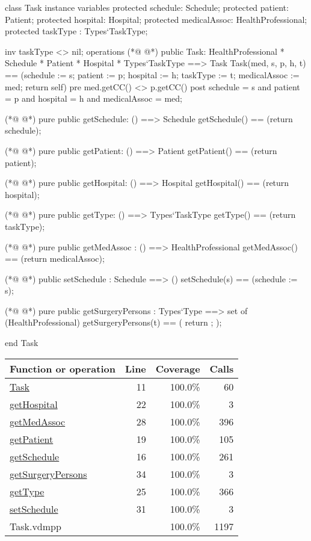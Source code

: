 \begin{vdmpp}[breaklines=true]
class Task
instance variables
  protected schedule: Schedule;
  protected patient: Patient;
  protected hospital: Hospital;
  protected medicalAssoc: HealthProfessional;
  protected taskType : Types`TaskType;

  inv taskType <> nil;
operations
(*@
\label{Task:11}
@*)
 public Task: HealthProfessional * Schedule * Patient * Hospital * Types`TaskType ==> Task
  Task(med, s, p, h, t) == (schedule := s; patient := p; hospital := h; taskType := t; medicalAssoc := med; return self)
 pre med.getCC() <> p.getCC()
 post schedule = s and patient = p and hospital = h and medicalAssoc = med;
 
(*@
\label{getSchedule:16}
@*)
 pure public getSchedule: () ==> Schedule
  getSchedule() == (return schedule);
  
(*@
\label{getPatient:19}
@*)
 pure public getPatient: () ==> Patient
  getPatient() == (return patient);
  
(*@
\label{getHospital:22}
@*)
 pure public getHospital: () ==> Hospital
  getHospital() == (return hospital);
  
(*@
\label{getType:25}
@*)
 pure public getType: () ==> Types`TaskType
  getType() == (return taskType);
  
(*@
\label{getMedAssoc:28}
@*)
 pure public getMedAssoc : () ==> HealthProfessional
  getMedAssoc() == (return medicalAssoc);
  
(*@
\label{setSchedule:31}
@*)
 public setSchedule : Schedule ==> ()
  setSchedule(s) == (schedule := s);
  
(*@
\label{getSurgeryPersons:34}
@*)
 pure public getSurgeryPersons : Types`Type ==> set of (HealthProfessional)
  getSurgeryPersons(t) == ( return {}; );

end Task
\end{vdmpp}
\bigskip
\begin{longtable}{|l|r|r|r|}
\hline
Function or operation & Line & Coverage & Calls \\
\hline
\hline
\hyperref[Task:11]{Task} & 11&100.0\% & 60 \\
\hline
\hyperref[getHospital:22]{getHospital} & 22&100.0\% & 3 \\
\hline
\hyperref[getMedAssoc:28]{getMedAssoc} & 28&100.0\% & 396 \\
\hline
\hyperref[getPatient:19]{getPatient} & 19&100.0\% & 105 \\
\hline
\hyperref[getSchedule:16]{getSchedule} & 16&100.0\% & 261 \\
\hline
\hyperref[getSurgeryPersons:34]{getSurgeryPersons} & 34&100.0\% & 3 \\
\hline
\hyperref[getType:25]{getType} & 25&100.0\% & 366 \\
\hline
\hyperref[setSchedule:31]{setSchedule} & 31&100.0\% & 3 \\
\hline
\hline
Task.vdmpp & & 100.0\% & 1197 \\
\hline
\end{longtable}

